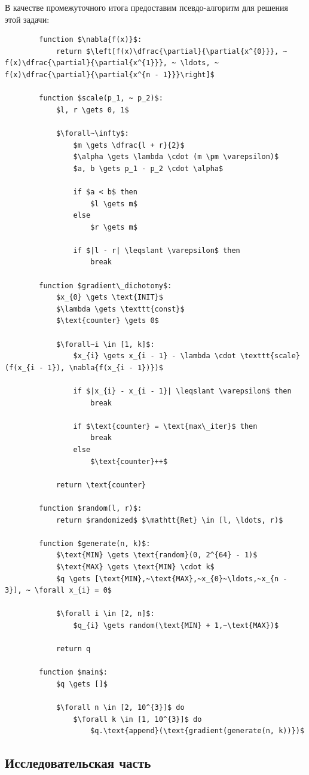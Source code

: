 \documentclass[12pt, a4paper, oneside, final]{article}
\begin{document}
	В качестве промежуточного итога предоставим псевдо-алгоритм для решения этой задачи:
	\begin{lstlisting}
		function $\nabla{f(x)}$:
			return $\left[f(x)\dfrac{\partial}{\partial{x^{0}}}, ~ f(x)\dfrac{\partial}{\partial{x^{1}}}, ~ \ldots, ~ f(x)\dfrac{\partial}{\partial{x^{n - 1}}}\right]$
		
		function $scale(p_1, ~ p_2)$:
			$l, r \gets 0, 1$

			$\forall~\infty$:
				$m \gets \dfrac{l + r}{2}$
				$\alpha \gets \lambda \cdot (m \pm \varepsilon)$
				$a, b \gets p_1 - p_2 \cdot \alpha$
		
				if $a < b$ then
					$l \gets m$
				else
					$r \gets m$
		
				if $|l - r| \leqslant \varepsilon$ then
					break
		
		function $gradient\_dichotomy$:
			$x_{0} \gets \text{INIT}$
			$\lambda \gets \texttt{const}$
			$\text{counter} \gets 0$

			$\forall~i \in [1, k]$:
				$x_{i} \gets x_{i - 1} - \lambda \cdot \texttt{scale}(f(x_{i - 1}), \nabla{f(x_{i - 1})})$

				if $|x_{i} - x_{i - 1}| \leqslant \varepsilon$ then
					break

				if $\text{counter} = \text{max\_iter}$ then
					break
				else
					$\text{counter}++$
		
			return \text{counter}
		
		function $random(l, r)$:
			return $randomized$ $\mathtt{Ret} \in [l, \ldots, r)$
		
		function $generate(n, k)$:
			$\text{MIN} \gets \text{random}(0, 2^{64} - 1)$
			$\text{MAX} \gets \text{MIN} \cdot k$
			$q \gets [\text{MIN},~\text{MAX},~x_{0}~\ldots,~x_{n - 3}], ~ \forall x_{i} = 0$
		
			$\forall i \in [2, n]$:
				$q_{i} \gets random(\text{MIN} + 1,~\text{MAX})$
		
			return q
		
		function $main$:
			$q \gets []$

			$\forall n \in [2, 10^{3}]$ do
				$\forall k \in [1, 10^{3}]$ do
					$q.\text{append}(\text{gradient(generate(n, k))})$
	\end{lstlisting}
	\subsection*{Исследовательская часть}
	\newpage
\end{document}
